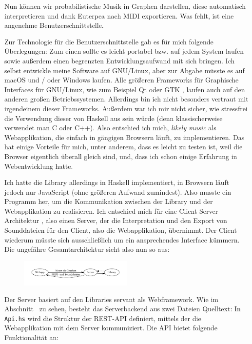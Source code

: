 \documentclass[a4paper,twocolumn]{article}
\begin{document}
Nun können wir probabilistische Musik in Graphen darstellen, diese automatisch
interpretieren und dank Euterpea nach MIDI exportieren. Was fehlt, ist eine
angenehme Benutzerschnittstelle.

Zur Technologie für die Benutzerschnittstelle gab es für mich folgende
Überlegungen: Zum einen sollte es leicht portabel bzw. auf jedem System laufen
sowie außerdem einen begrenzten Entwicklungsaufwand mit sich bringen.
Ich selbst entwickle meine Software auf
GNU/Linux, aber zur Abgabe müsste es auf macOS und / oder Windows laufen. Alle
größeren Frameworks für Graphische Interfaces für GNU/Linux, wie zum Beispiel Qt
\cite{qt} oder GTK \cite{gtk}, laufen auch auf den anderen großen
Betriebssystemen. Allerdings bin ich nicht besonders vertraut mit irgendeinem
dieser Frameworks. Außerdem war ich mir nicht sicher, wie stressfrei die
Verwendung dieser von Haskell aus sein würde (denn klassischerweise verwendet
man C oder C++). Also entschied ich mich, {\it likely music} als Webapplikation,
die einfach in gängigen Browsern läuft, zu implementieren. Das hat einige
Vorteile für mich, unter anderem, dass es leicht zu testen ist, weil die Browser
eigentlich überall gleich sind, und, dass ich schon einige Erfahrung in
Webentwicklung hatte.

Ich hatte die Library allerdings in Haskell implementiert, in Browsern
läuft jedoch nur JavaScript (ohne größeren Aufwand zumindest). Also musste
ein Programm her, um die Kommunikation zwischen der Library und der
Webapplikation zu realisieren. Ich entschied mich für eine
Client-Server-Architektur \cite{wikipedia_client_server}, also einen Server, der
die Interpretation und den Export von Sounddateien für den Client, also die
Webapplikation, übernimmt. Der Client wiederum müsste sich ausschließlich um ein
ansprechendes Interface kümmern. Die ungefähre Gesamtarchitektur sieht also nun
so aus:

\begin{figure}[h]
  \includegraphics[width=0.5\textwidth]{architektur}
\end{figure}

Der Server basiert auf den Libraries servant \cite{servant} als Webframework.
Wie im Abschnitt~ zu sehen, besteht das Serverbackend aus
zwei Dateien Quelltext: In \lstinline|Api.hs| wird die
Struktur der REST-API \cite{wikipedia_rest} definiert, mittels der die
Webapplikation mit dem Server kommuniziert. Die API bietet folgende Funktionalität
an:
\end{document}
